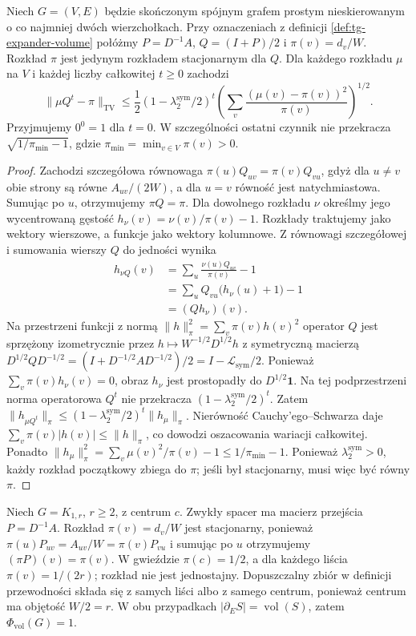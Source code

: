\begin{twierdzenie}
\label{thm:tg-expander-weighted-mixing}
Niech $G=(V,E)$ będzie skończonym spójnym grafem
prostym nieskierowanym o co najmniej dwóch
wierzchołkach. Przy oznaczeniach z definicji
\ref{def:tg-expander-volume} połóżmy
$P=D^{-1}A$, $Q=(I+P)/2$ i $\pi(v)=d_v/W$.
Rozkład $\pi$ jest jedynym rozkładem stacjonarnym
dla $Q$. Dla każdego rozkładu $\mu$ na $V$ i
każdej liczby całkowitej $t\geq0$ zachodzi
\[
\|\mu Q^t-\pi\|_{\mathrm{TV}}
\leq\frac12(1-\lambda_2^{\mathrm{sym}}/2)^t
\left(\sum_v\frac{(\mu(v)-\pi(v))^2}{\pi(v)}\right)^{1/2}.
\]
Przyjmujemy $0^0=1$ dla $t=0$.
W szczególności ostatni czynnik nie przekracza
$\sqrt{1/\pi_{\min}-1}$, gdzie
$\pi_{\min}=\min_{v\in V}\pi(v)>0$.
\end{twierdzenie}
\begin{proof}
Zachodzi szczegółowa równowaga
$\pi(u)Q_{uv}=\pi(v)Q_{vu}$, gdyż dla $u\ne v$
obie strony są równe $A_{uv}/(2W)$, a dla $u=v$
równość jest natychmiastowa. Sumując po $u$,
otrzymujemy $\pi Q=\pi$.
Dla dowolnego rozkładu $\nu$ określmy jego
wycentrowaną gęstość $h_\nu(v)=\nu(v)/\pi(v)-1$.
Rozkłady traktujemy jako wektory wierszowe,
a funkcje jako wektory kolumnowe. Z równowagi
szczegółowej i sumowania wierszy $Q$ do jedności
wynika
\[
\begin{aligned}
h_{\nu Q}(v)
&=\sum_u\frac{\nu(u)Q_{uv}}{\pi(v)}-1\\
&=\sum_u Q_{vu}\bigl(h_\nu(u)+1\bigr)-1\\
&=(Qh_\nu)(v).
\end{aligned}
\]
Na przestrzeni funkcji z normą
$\|h\|_\pi^2=\sum_v\pi(v)h(v)^2$
operator $Q$ jest sprzężony izometrycznie
przez $h\mapsto W^{-1/2}D^{1/2}h$
z symetryczną macierzą
$D^{1/2}QD^{-1/2}=
(I+D^{-1/2}AD^{-1/2})/2=I-\mathcal L_{\mathrm{sym}}/2$.
Ponieważ $\sum_v\pi(v)h_\nu(v)=0$,
obraz $h_\nu$ jest prostopadły do
$D^{1/2}\boldsymbol1$. Na tej podprzestrzeni
norma operatorowa $Q^t$ nie przekracza
$(1-\lambda_2^{\mathrm{sym}}/2)^t$.
Zatem $\|h_{\mu Q^t}\|_\pi\leq
(1-\lambda_2^{\mathrm{sym}}/2)^t\|h_\mu\|_\pi$.
Nierówność Cauchy'ego--Schwarza daje
$\sum_v\pi(v)|h(v)|\leq\|h\|_\pi$, co dowodzi
oszacowania wariacji całkowitej.
Ponadto
$\|h_\mu\|_\pi^2=\sum_v\mu(v)^2/\pi(v)-1
\leq1/\pi_{\min}-1$.
Ponieważ $\lambda_2^{\mathrm{sym}}>0$,
każdy rozkład początkowy zbiega do $\pi$;
jeśli był stacjonarny, musi więc być równy $\pi$.
\end{proof}

\begin{przyklad}
\label{ex:tg-expander-star}
Niech $G=K_{1,r}$, $r\geq2$, z centrum $c$.
Zwykły spacer ma macierz przejścia $P=D^{-1}A$.
Rozkład $\pi(v)=d_v/W$ jest stacjonarny, ponieważ
$\pi(u)P_{uv}=A_{uv}/W=\pi(v)P_{vu}$ i sumując
po $u$ otrzymujemy $(\pi P)(v)=\pi(v)$.
W gwieździe $\pi(c)=1/2$, a dla każdego liścia
$\pi(v)=1/(2r)$; rozkład nie jest jednostajny.
Dopuszczalny zbiór w definicji przewodności składa
się z samych liści albo z samego centrum, ponieważ
centrum ma objętość $W/2=r$. W obu przypadkach
$|\partial_ES|=\operatorname{vol}(S)$, zatem
$\Phi_{\mathrm{vol}}(G)=1$.
\end{przyklad}

